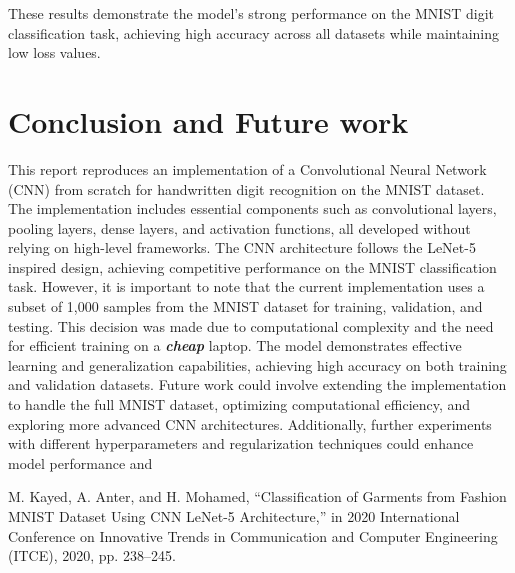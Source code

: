 \documentclass[conference]{IEEEtran}
\begin{document}
These results demonstrate the model's strong performance on the MNIST digit classification task, achieving high accuracy across all datasets while maintaining low loss values.

\section{Conclusion and Future work}
This report reproduces an implementation of a Convolutional Neural Network (CNN) from scratch for handwritten digit recognition on the MNIST dataset. The implementation includes essential components such as convolutional layers, pooling layers, dense layers, and activation functions, all developed without relying on high-level frameworks. The CNN architecture follows the LeNet-5 inspired design, achieving competitive performance on the MNIST classification task.
However, it is important to note that the current implementation uses a subset of 1,000 samples from the MNIST dataset for training, validation, and testing. This decision was made due to computational complexity and the need for efficient training on a \textit{\textbf{cheap}} laptop. The model demonstrates effective learning and generalization capabilities, achieving high accuracy on both training and validation datasets.
Future work could involve extending the implementation to handle the full MNIST dataset, optimizing computational efficiency, and exploring more advanced CNN architectures. Additionally, further experiments with different hyperparameters and regularization techniques could enhance model performance and 

\begin{thebibliography}{00}
 M. Kayed, A. Anter, and H. Mohamed, ``Classification of Garments from Fashion MNIST Dataset Using CNN LeNet-5 Architecture,'' in 2020 International Conference on Innovative Trends in Communication and Computer Engineering (ITCE), 2020, pp. 238--245.
\end{thebibliography}
\end{document}
